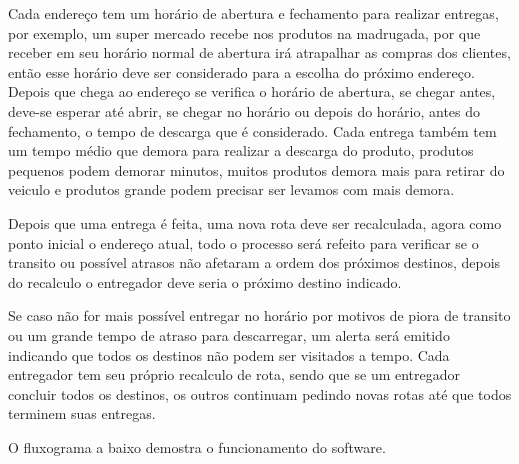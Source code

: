 Cada endereço tem um horário de abertura e fechamento para realizar entregas, por exemplo, um super mercado recebe nos produtos na madrugada, por que receber em seu horário normal de abertura irá atrapalhar as compras dos clientes, então esse horário deve ser considerado para a escolha do próximo endereço. 
Depois que chega ao endereço se verifica o horário de abertura, se chegar antes, deve-se esperar até abrir, se chegar no horário ou depois do horário, antes do fechamento, o tempo de descarga que é considerado.
Cada entrega também tem um tempo médio que demora para realizar a descarga do produto, produtos pequenos podem demorar minutos, muitos produtos demora mais para retirar do veiculo e produtos grande podem precisar ser levamos com mais demora.

Depois que uma entrega é feita, uma nova rota deve ser recalculada, agora como ponto inicial o endereço atual, todo o processo será refeito para verificar se o transito ou possível atrasos não afetaram a ordem dos próximos destinos, depois do recalculo o entregador deve seria o próximo destino indicado.

Se caso não for mais possível entregar no horário por motivos de piora de transito ou um grande tempo de atraso para descarregar, um alerta será emitido indicando que todos os destinos não podem ser visitados a tempo.
Cada entregador tem seu próprio recalculo de rota, sendo que se um entregador concluir todos os destinos, os outros continuam pedindo novas rotas até que todos terminem suas entregas.

O fluxograma a baixo demostra o funcionamento do software.

\begin{minipage}{\linewidth}
    \label{fig:FluxoSoftware}
\end{minipage}

